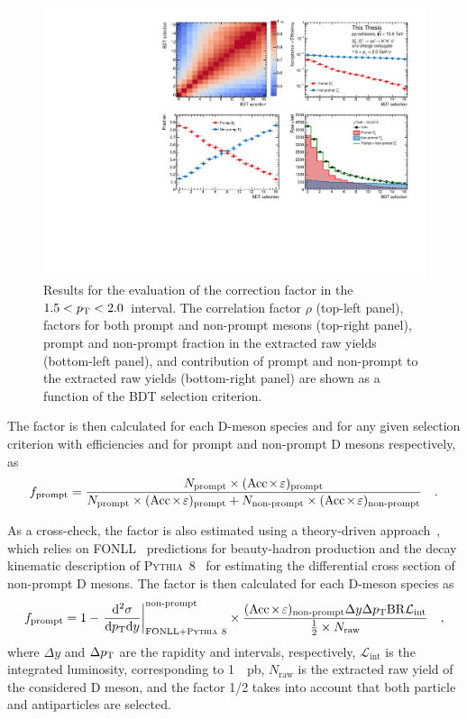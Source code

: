 \begin{figure}[htb]
    \begin{center}
    \includegraphics[width=\textwidth]{Figures/Chapter 6/DsPromptFrac.pdf}
    \caption{Results for the evaluation of the \ds \fp correction factor in the $1.5<p_\mathrm{T}<2.0$~\gevc interval. The correlation factor $\rho$ (top-left panel), \aeff factors for both prompt and non-prompt \ds mesons (top-right panel), prompt and non-prompt fraction in the extracted \ds raw yields (bottom-left panel), and contribution of prompt and non-prompt to the extracted raw yields (bottom-right panel) are shown as a function of the BDT selection criterion.} 
    \label{fig:fp} 
    \end{center}
\end{figure}

The \fp factor is then calculated for each D-meson species and for any given selection criterion with efficiencies \aeffp and \aeffnp for prompt and non-prompt D mesons respectively, as
\begin{equation*}
    f_\mathrm{prompt} = \frac{N_\mathrm{prompt}\times(\mathrm{Acc}\mkern-2mu\times\mkern-2mu\varepsilon)_\mathrm{prompt}}{N_\mathrm{prompt}\times(\mathrm{Acc}\mkern-2mu\times\mkern-2mu\varepsilon)_\mathrm{prompt} + N_\mathrm{non\text{-}prompt}\times(\mathrm{Acc}\mkern-2mu\times\mkern-2mu\varepsilon)_\mathrm{non\text{-}prompt}}\quad .
\end{equation*}

As a cross-check, the \fp factor is also estimated using a theory-driven approach~\cite{ALICE:2017olh}, which relies on FONLL~\cite{Cacciari:1998it} predictions for beauty-hadron production and the decay kinematic description of \textsc{Pythia~8}~\cite{Bierlich:2022pfr} for estimating the \pt differential cross section of non-prompt D mesons. The \fp factor is then calculated for each D-meson species as 
\begin{equation*}
    f_\mathrm{prompt} = 1-\left.\frac{\mathrm{d}^2\sigma}{\mathrm{d}p_\mathrm{T}\mathrm{d} y}\right\vert_\mathrm{FONLL+\textsc{Pythia}~8}^\mathrm{non\text{-}prompt}\times\frac{(\mathrm{Acc}\mkern-2mu\times\mkern-2mu\varepsilon)_\mathrm{non\text{-}prompt} \Delta y \Delta p_\mathrm{T} \mathrm{BR} \mathcal{L}_\mathrm{int}}{\frac{1}{2}\times N_\mathrm{raw} }\quad ,
\end{equation*}
where $\Delta y$ and $\Delta p_\mathrm{T}$ are the rapidity and \pt intervals, respectively, $\mathcal{L}_\mathrm{int}$ is the integrated luminosity, corresponding to \SI{1}{\per\pico\barn}, $N_\mathrm{raw}$ is the extracted raw yield of the considered D meson, and the factor 1/2 takes into account that both particle and antiparticles are selected. 

